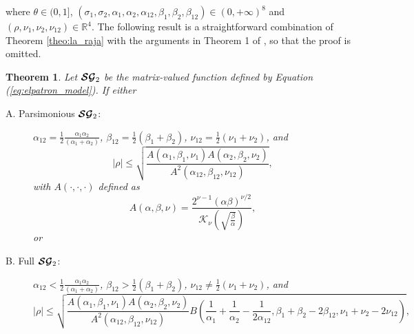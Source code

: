 \documentclass[12pt]{article}
\theoremstyle{plain}
\newtheorem{theorem}{Theorem}[section]
\theoremstyle{remark}
\newcommand{\abs}[1]{\left| #1 \right|}
\newcommand{\R}[0]{\mathbb{R}}
\newcommand{\tobi}[1]{\textcolor{teal}{#1}}
\begin{document}
    where {$\theta \in (0,1]$, $(\sigma_{1}, \sigma_{2}, \alpha_{1}, \alpha_{2}, \alpha_{12}, \beta_{1}, \beta_{2}, \beta_{12}) \in (0,+\infty)^8$ and $(\rho, \nu_1, \nu_2, \nu_{12}) \in \R^4$}. %
    The following result is a straightforward combination of Theorem \ref{theo:la_raja} with the arguments in Theorem 1 of \cite{porcu2018shkarofsky}, so that the proof is omitted.
    \begin{theorem} 
        \label{theo:el_patron}
        Let $\boldsymbol{{\cal SG}}_2$ be the matrix-valued function defined by Equation (\ref{eq:elpatron_model}). %
        If either
        \begin{description}
            \item[A. {\sc Parsimonious} $\boldsymbol{{\cal SG}}_2$: ] $\alpha_{12}= \frac{1}{2} \frac{\alpha_1 \alpha_2}{(\alpha_1+ \alpha_2)}$, $\beta_{12}= \frac{1}{2}(\beta_1 + \beta_2)$, $\nu_{12}= \frac{1}{2} \left ( \nu_1 + \nu_ 2 \right )$, and $$ | \rho | \le   \sqrt{ \frac{A(\alpha_1,\beta_1,\nu_1) A(\alpha_2,\beta_2,\nu_2)}{A^2(\alpha_{12},\beta_{12},\nu_{12})}},$$ with $A(\cdot,\cdot,\cdot)$ defined as 
            \begin{equation*}
                \label{eq:normalizing}
                A(\alpha,\beta,\nu) = \frac{2^{\nu-1} \left ( \alpha \beta \right )^{\nu/2}}{\mathcal{K}_{\nu} \left ( \sqrt{\frac{\beta}{\alpha}} \right ) },
            \end{equation*} 
            or 
            \item[B. {\sc Full} $\boldsymbol{{\cal SG}}_2$: ] $\alpha_{12} < \frac{1}{2} \frac{\alpha_1 \alpha_2}{(\alpha_1+ \alpha_2)}$, $\beta_{12} > \frac{1}{2}(\beta_1 + \beta_2)$, $\nu_{12} \ne \frac{1}{2} \left ( \nu_1 + \nu_ 2 \right )$, and 
            \begin{equation*}
                \abs{\rho} \le  \sqrt{ \frac{A(\alpha_1,\beta_1,\nu_1) A(\alpha_2,\beta_2,\nu_2)}{A^2(\alpha_{12},\beta_{12},\nu_{12})}  B \left (\frac{1}{\alpha_1}+\frac{1}{\alpha_2}- \frac{1}{2 \alpha_{12}}, \beta_1+\beta_2- 2 \beta_{12}, \nu_1+ \nu_2 - 2 \nu_{12}  \right )  },

\end{equation*}
\end{description}
\end{theorem}
\end{document}
